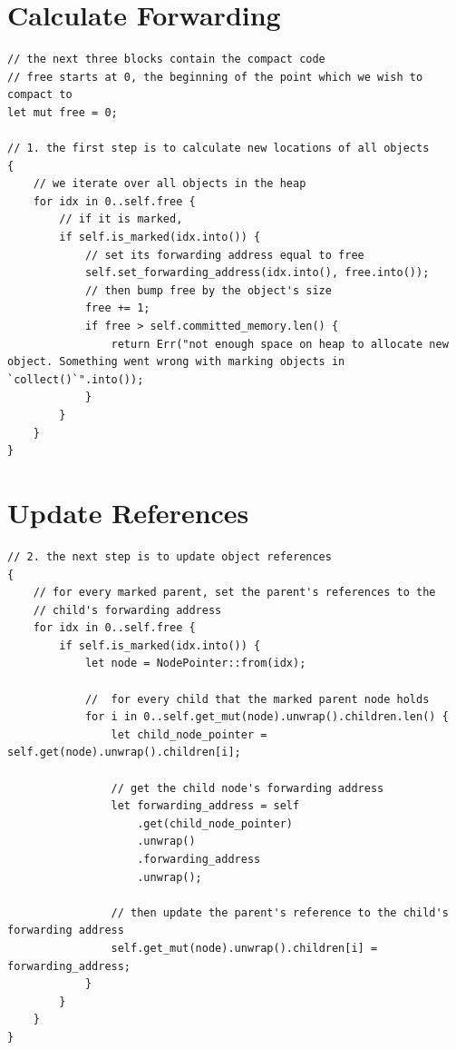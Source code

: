 \documentclass[index]{subfiles}
\begin{document}
\section{Calculate Forwarding}
\begin{verbatim}
// the next three blocks contain the compact code
// free starts at 0, the beginning of the point which we wish to compact to
let mut free = 0;

// 1. the first step is to calculate new locations of all objects
{
    // we iterate over all objects in the heap
    for idx in 0..self.free {
        // if it is marked,
        if self.is_marked(idx.into()) {
            // set its forwarding address equal to free
            self.set_forwarding_address(idx.into(), free.into());
            // then bump free by the object's size
            free += 1;
            if free > self.committed_memory.len() {
                return Err("not enough space on heap to allocate new object. Something went wrong with marking objects in `collect()`".into());
            }
        }
    }
}
\end{verbatim}
\section{Update References}
\begin{verbatim}
// 2. the next step is to update object references
{
    // for every marked parent, set the parent's references to the
    // child's forwarding address
    for idx in 0..self.free {
        if self.is_marked(idx.into()) {
            let node = NodePointer::from(idx);

            //  for every child that the marked parent node holds
            for i in 0..self.get_mut(node).unwrap().children.len() {
                let child_node_pointer = self.get(node).unwrap().children[i];

                // get the child node's forwarding address
                let forwarding_address = self
                    .get(child_node_pointer)
                    .unwrap()
                    .forwarding_address
                    .unwrap();

                // then update the parent's reference to the child's forwarding address
                self.get_mut(node).unwrap().children[i] = forwarding_address;
            }
        }
    }
}
\end{verbatim}
\end{document}
